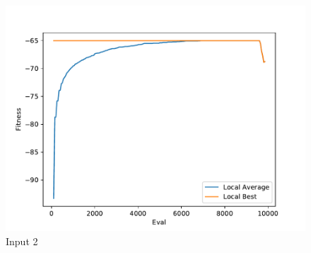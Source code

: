 \documentclass{standalone}
\begin{document}
\begin{figure}[!htb]
	\caption{Input 2}
	\label{fig:graph_2023}
	\includegraphics[width=\textwidth]{../graphs/graphs/2023.pdf}
\end{figure}
\end{document}
